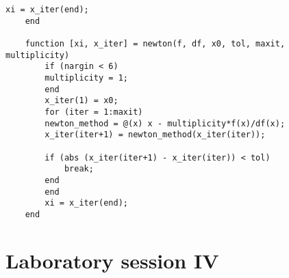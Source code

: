 \documentclass[12pt, a4paper]{report}
\begin{document}
\begin{lstlisting}[style=Matlab]
        xi = x_iter(end);
    end

    function [xi, x_iter] = newton(f, df, x0, tol, maxit, multiplicity)
        if (nargin < 6)
        multiplicity = 1;
        end
        x_iter(1) = x0;
        for (iter = 1:maxit)
        newton_method = @(x) x - multiplicity*f(x)/df(x);
        x_iter(iter+1) = newton_method(x_iter(iter));

        if (abs (x_iter(iter+1) - x_iter(iter)) < tol)
            break;
        end
        end
        xi = x_iter(end);
    end
        \end{lstlisting}  

\newpage

\chapter{Laboratory session IV}
\end{document}
